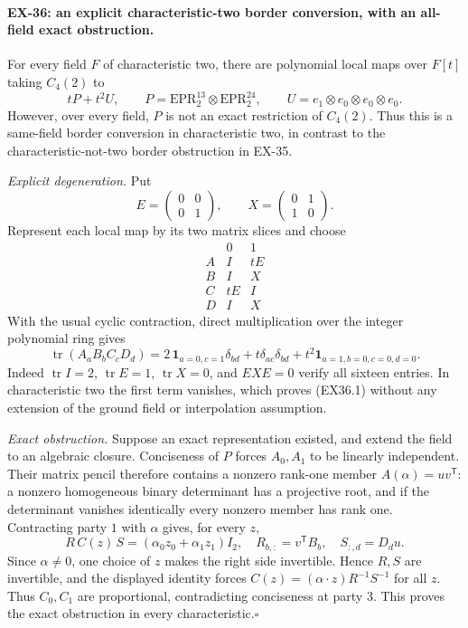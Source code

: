 \paragraph{EX-36: an explicit characteristic-two border conversion, with an all-field exact obstruction.}
For every field $F$ of characteristic two, there are polynomial
local maps over $F[t]$ taking $C_4(2)$ to
\[
 tP+t^2U,\qquad
 P=\mathrm{EPR}_2^{13}\otimes\mathrm{EPR}_2^{24},\qquad
 U=e_1\otimes e_0\otimes e_0\otimes e_0.
 \tag{EX36.1}
\]
However, over every field, $P$ is not an exact restriction of
$C_4(2)$. Thus this is a same-field border conversion in
characteristic two, in contrast to the characteristic-not-two
border obstruction in EX-35.

\emph{Explicit degeneration.}
Put
\[
 E=\begin{pmatrix}0&0\\0&1\end{pmatrix},\qquad
 X=\begin{pmatrix}0&1\\1&0\end{pmatrix}.
\]
Represent each local map by its two matrix slices and choose
\[
 \begin{array}{c|cc}
     &0&1\\\hline
 A&I&tE\\
 B&I&X\\
 C&tE&I\\
 D&I&X
 \end{array}
\]
With the usual cyclic contraction, direct multiplication
over the integer polynomial ring gives
\[
 \operatorname{tr}(A_aB_bC_cD_d)
 =2\,\mathbf1_{a=0,c=1}\delta_{bd}
   +t\delta_{ac}\delta_{bd}
   +t^2\mathbf1_{a=1,b=0,c=0,d=0}.
 \tag{EX36.2}
\]
Indeed $\operatorname{tr}I=2$, $\operatorname{tr}E=1$,
$\operatorname{tr}X=0$, and $EXE=0$ verify all sixteen
entries. In characteristic two the first term vanishes,
which proves (EX36.1) without any extension of the ground
field or interpolation assumption.

\emph{Exact obstruction.}
Suppose an exact representation existed, and extend the
field to an algebraic closure. Conciseness of $P$ forces
$A_0,A_1$ to be linearly independent. Their matrix pencil
therefore contains a nonzero rank-one member
$A(\alpha)=uv^{\mathsf T}$: a nonzero homogeneous binary
determinant has a projective root, and if the determinant
vanishes identically every nonzero member has rank one.
Contracting party $1$ with $\alpha$ gives, for every $z$,
\[
 R\,C(z)\,S=(\alpha_0z_0+\alpha_1z_1)I_2,
 \quad
 R_{b,:}=v^{\mathsf T}B_b,\quad
 S_{:,d}=D_d u.
\]
Since $\alpha\ne0$, one choice of $z$ makes the right
side invertible. Hence $R,S$ are invertible, and the displayed
identity forces
$C(z)=(\alpha\cdot z)R^{-1}S^{-1}$ for all $z$.
Thus $C_0,C_1$ are proportional, contradicting conciseness
at party $3$. This proves the exact obstruction in every
characteristic.\hfill$\square$

